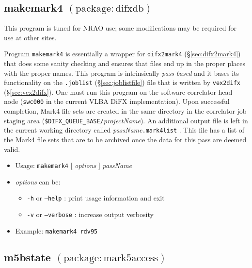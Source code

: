 
\subsection{makemark4 {\small $\mathrm{(package: difxdb)}$}} \label{sec:makemark4}

This program is tuned for NRAO use; some modifications may be required for use at other sites.

Program {\tt makemark4} is essentially a wrapper for {\tt difx2mark4} (\S\ref{sec:difx2mark4}) that does some sanity checking and ensures that files end up in the proper places with the proper names.
This program is intrinsically {\em pass-based} and it bases its functionality on the {\tt .joblist} (\S\ref{sec:joblistfile}) file that is written by {\tt vex2difx} (\S\ref{sec:vex2difx}).
One must run this program on the software correlator head node ({\tt swc000} in the current VLBA DiFX implementation).
Upon successful completion, Mark4 file sets are created in the same directory in the correlator job staging area ({\tt \$DIFX\_QUEUE\_BASE/}{\em projectName}).
An additional output file is left in the current working directory called {\em passName}{\tt .mark4list} .
This file has a list of the Mark4 file sets that are to be archived once the data for this pass are deemed valid.

\begin{itemize}
\item[] Usage: {\tt makemark4} $[$ {\em options} $]$ {\em passName}
\item[] {\em options} can be:
\begin{itemize}
\item[] {\tt -h} or {\tt --help} : print usage information and exit
\item[] {\tt -v} or {\tt --verbose} : increase output verbosity
\end{itemize}
\item[] Example: {\tt makemark4 rdv95}
\end{itemize}








\subsection{m5bstate {\small $\mathrm{(package: mark5access)}$}} \label{sec:m5bstate}

